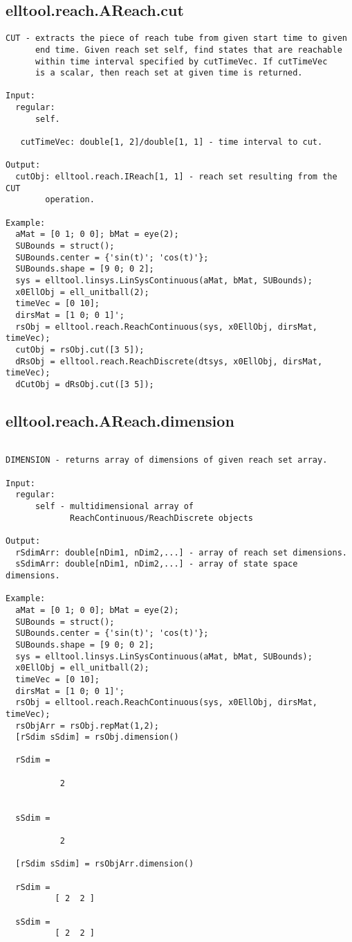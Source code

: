 \subsection{\texorpdfstring{elltool.reach.AReach.cut}{cut}}\label{method:elltool.reach.AReach.cut}
\begin{verbatim}
CUT - extracts the piece of reach tube from given start time to given
      end time. Given reach set self, find states that are reachable
      within time interval specified by cutTimeVec. If cutTimeVec
      is a scalar, then reach set at given time is returned.

Input:
  regular:
      self.

   cutTimeVec: double[1, 2]/double[1, 1] - time interval to cut.

Output:
  cutObj: elltool.reach.IReach[1, 1] - reach set resulting from the CUT
        operation.

Example:
  aMat = [0 1; 0 0]; bMat = eye(2);
  SUBounds = struct();
  SUBounds.center = {'sin(t)'; 'cos(t)'};
  SUBounds.shape = [9 0; 0 2];
  sys = elltool.linsys.LinSysContinuous(aMat, bMat, SUBounds);
  x0EllObj = ell_unitball(2);
  timeVec = [0 10];
  dirsMat = [1 0; 0 1]';
  rsObj = elltool.reach.ReachContinuous(sys, x0EllObj, dirsMat, timeVec);
  cutObj = rsObj.cut([3 5]);
  dRsObj = elltool.reach.ReachDiscrete(dtsys, x0EllObj, dirsMat, timeVec);
  dCutObj = dRsObj.cut([3 5]);
\end{verbatim}
\subsection{\texorpdfstring{elltool.reach.AReach.dimension}{dimension}}\label{method:elltool.reach.AReach.dimension}
\begin{verbatim}

DIMENSION - returns array of dimensions of given reach set array.

Input:
  regular:
      self - multidimensional array of
             ReachContinuous/ReachDiscrete objects

Output:
  rSdimArr: double[nDim1, nDim2,...] - array of reach set dimensions.
  sSdimArr: double[nDim1, nDim2,...] - array of state space dimensions.

Example:
  aMat = [0 1; 0 0]; bMat = eye(2);
  SUBounds = struct();
  SUBounds.center = {'sin(t)'; 'cos(t)'};
  SUBounds.shape = [9 0; 0 2];
  sys = elltool.linsys.LinSysContinuous(aMat, bMat, SUBounds);
  x0EllObj = ell_unitball(2);
  timeVec = [0 10];
  dirsMat = [1 0; 0 1]';
  rsObj = elltool.reach.ReachContinuous(sys, x0EllObj, dirsMat, timeVec);
  rsObjArr = rsObj.repMat(1,2);
  [rSdim sSdim] = rsObj.dimension()

  rSdim =

           2


  sSdim =

           2

  [rSdim sSdim] = rsObjArr.dimension()

  rSdim =
          [ 2  2 ]

  sSdim =
          [ 2  2 ]
\end{verbatim}

